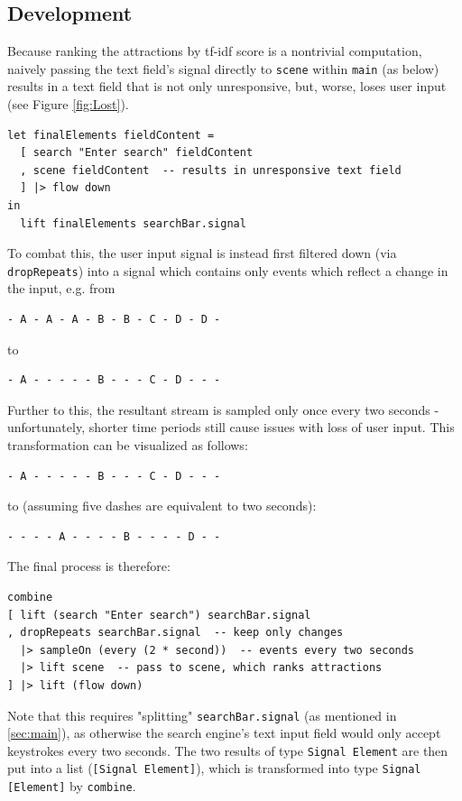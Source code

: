 \documentclass[12pt]{article}
\begin{document}
\subsection{Development}
Because ranking the attractions by tf-idf score is a nontrivial computation, naively passing the text field's signal directly to \texttt{scene} within \texttt{main} (as below) results in a text field that is not only unresponsive, but, worse, loses user input (see Figure \ref{fig:Lost}).
\begin{samepage}
\begin{verbatim}
let finalElements fieldContent = 
  [ search "Enter search" fieldContent
  , scene fieldContent  -- results in unresponsive text field
  ] |> flow down
in
  lift finalElements searchBar.signal
\end{verbatim}
\end{samepage}
To combat this, the user input signal is instead first filtered down (via \texttt{dropRepeats}) into a signal which contains only events which reflect a change in the input, e.g. from
\begin{samepage}
\begin{verbatim}
- A - A - A - B - B - C - D - D -
\end{verbatim}
to
\begin{verbatim}
- A - - - - - B - - - C - D - - -
\end{verbatim}
\end{samepage}
Further to this, the resultant stream is sampled only once every two seconds - unfortunately, shorter time periods still cause issues with loss of user input. This transformation can be visualized as follows:
\begin{samepage}
\begin{verbatim}
- A - - - - - B - - - C - D - - -
\end{verbatim}
to (assuming five dashes are equivalent to two seconds):
\begin{verbatim}
- - - - A - - - - B - - - - D - -
\end{verbatim}
\end{samepage}
The final process is therefore:
\begin{samepage}
\begin{verbatim}
combine
[ lift (search "Enter search") searchBar.signal
, dropRepeats searchBar.signal  -- keep only changes
  |> sampleOn (every (2 * second))  -- events every two seconds
  |> lift scene  -- pass to scene, which ranks attractions
] |> lift (flow down)
\end{verbatim}
\end{samepage}
Note that this requires "splitting" \texttt{searchBar.signal} (as mentioned in \ref{sec:main}), as otherwise the search engine's text input field would only accept keystrokes every two seconds. The two results of type \texttt{Signal Element} are then put into a list (\texttt{[Signal Element]}), which is transformed into type \texttt{Signal [Element]} by \texttt{combine}.
\end{document}
